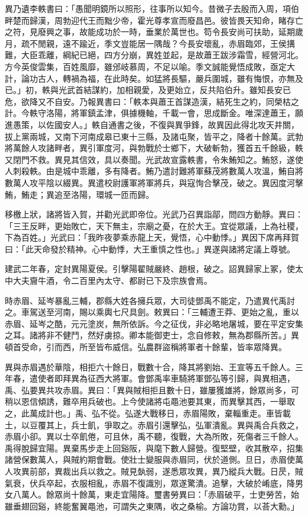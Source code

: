 \begin{pinyinscope}
異乃遺李軼書曰：「愚聞明鏡所以照形，往事所以知今。昔微子去殷而入周，項伯畔楚而歸漢，周勃迎代王而黜少帝，霍光尊孝宣而廢昌邑。彼皆畏天知命，睹存亡之符，見廢興之事，故能成功於一時，垂業於萬世也。笱令長安尚可扶助，延期歲月，疏不閒親，遠不踰近，季文豈能居一隅哉？今長安壞亂，赤眉臨郊，王侯搆難，大臣乖離，綱紀已絕，四方分崩，異姓並起，是故蕭王跋涉霜雪，經營河北。方今英俊雲集，百姓風靡，雖邠岐慕周，不足以喻。季文誠能覺悟成敗，亟定大計，論功古人，轉禍為福，在此時矣。如猛將長驅，嚴兵圍城，雖有悔恨，亦無及已。」初，軼與光武首結謀約，加相親愛，及更始立，反共陷伯升。雖知長安已危，欲降又不自安。乃報異書曰：「軼本與蕭王首謀造漢，結死生之約，同榮枯之計。今軼守洛陽，將軍鎮孟津，俱據機軸，千載一會，思成斷金。唯深達蕭王，願進愚策，以佐國安人。」軼自通書之後，不復與異爭鋒，故異因此得北攻天井關，拔上黨兩城，又南下河南成皋已東十三縣，及諸屯聚，皆平之，降者十餘萬。武勃將萬餘人攻諸畔者，異引軍度河，與勃戰於士鄉下，大破斬勃，獲首五千餘級，軼又閉門不救。異見其信效，具以奏聞。光武故宣露軼書，令朱鮪知之。鮪怒，遂使人刺殺軼。由是城中乖離，多有降者。鮪乃遣討難將軍蘇茂將數萬人攻溫，鮪自將數萬人攻平陰以綴異。異遣校尉護軍將軍將兵，與寇恂合擊茂，破之。異因度河擊鮪，鮪走；異追至洛陽，環城一匝而歸。

移檄上狀，諸將皆入賀，并勸光武即帝位。光武乃召異詣鄗，問四方動靜。異曰：「三王反畔，更始敗亡，天下無主，宗廟之憂，在於大王。宜從眾議，上為社稷，下為百姓。」光武曰：「我昨夜夢乘赤龍上天，覺悟，心中動悸。」異因下席再拜賀曰：「此天命發於精神。心中動悸，大王重慎之性也。」異遂與諸將定議上尊號。

建武二年春，定封異陽夏侯。引擊陽翟賊嚴終、趙根，破之。詔異歸家上冢，使太中大夫齎牛酒，令二百里內太守、都尉已下及宗族會焉。

時赤眉、延岑暴亂三輔，郡縣大姓各擁兵眾，大司徒鄧禹不能定，乃遣異代禹討之。車駕送至河南，賜以乘輿七尺具劍。敕異曰：「三輔遭王莽、更始之亂，重以赤眉、延岑之酷，元元塗炭，無所依訴。今之征伐，非必略地屠城，要在平定安集之耳。諸將非不健鬥，然好虜掠。卿本能御吏士，念自修敕，無為郡縣所苦。」異頓首受命，引而西，所至皆布威信。弘農群盜稱將軍者十餘輩，皆率眾降異。

異與赤眉遇於華陰，相拒六十餘日，戰數十合，降其將劉始、王宣等五千餘人。三年春，遣使者即拜異為征西大將軍。會鄧禹率車騎將軍鄧弘等引歸，與異相遇，禹、弘要異共攻赤眉。異曰：「異與賊相拒且數十日，雖屢獲雄將，餘眾尚多，可稍以恩信傾誘，難卒用兵破也。上今使諸將屯黽池要其東，而異擊其西，一舉取之，此萬成計也。」禹、弘不從。弘遂大戰移日，赤眉陽敗，棄輜重走。車皆載土，以豆覆其上，兵士飢，爭取之。赤眉引還擊弘，弘軍潰亂。異與禹合兵救之，赤眉小卻。異以士卒飢倦，可且休，禹不聽，復戰，大為所敗，死傷者三千餘人。禹得脫歸宜陽。異棄馬步走上回谿阪，與麾下數人歸營。復堅壁，收其散卒，招集諸營保數萬人，與賊約期會戰。使壯士變服與赤眉同，伏於道側。旦日，赤眉使萬人攻異前部，異裁出兵以救之。賊見埶弱，遂悉眾攻異，異乃縱兵大戰。日昃，賊氣衰，伏兵卒起，衣服相亂，赤眉不復識別，眾遂驚潰。追擊，大破於崤底，降男女八萬人。餘眾尚十餘萬，東走宜陽降。璽書勞異曰：「赤眉破平，士吏勞苦，始雖垂翅回谿，終能奮翼黽池，可謂失之東隅，收之桑榆。方論功賞，以荅大勳。」


\end{pinyinscope}
